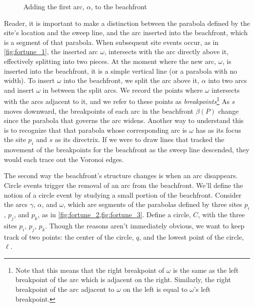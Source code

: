 \documentclass[12pt,twoside]{reedthesis}
\begin{document}

        \begin{figure}[!h]        
          \centering
          
          \caption{Adding the first arc, $\alpha$, to the beachfront}
          \label{fig:beachfront_se}
        \end{figure}

        Reader, it is important to make a distinction between the parabola defined by the site's location and the sweep line, and the arc inserted into the beachfront, which is a segment of that parabola. When subsequent site events occur, as in \cref{fig:fortune_1}, the inserted arc $\omega$, intersects with the arc directly above it, effectively splitting into two pieces. At the moment where the new arc, $\omega$, is inserted into the beachfront, it is a simple vertical line (or a parabola with no width). To insert $\omega$ into the beachfront, we split the arc above it, $\alpha$ into two arcs and insert $\omega$ in between the split arcs. We record the points where $\omega$ intersects with the arcs adjacent to it, and we refer to these points as \emph{breakpoints}\footnote{Note that this means that the right breakpoint of $\omega$ is the same as the left breakpoint of the arc which is adjacent on the right. Similarly, the right breakpoint of the arc adjacent to $\omega$ on the left is equal to $\omega$'s left breakpoint.} As $s$ moves downward, the breakpoints of each arc in the beachfront $\beta(P)$ change since the parabola that governs the arc widens. Another way to understand this is to recognize that that parabola whose corresponding arc is $\omega$ has as its focus the site $p_{i}$ and $s$ as its directrix. If we were to draw lines that tracked the movement of the breakpoints for the beachfront as the sweep line descended, they would each trace out the Voronoi edges. \par


        The second way the beachfront's structure changes is when an arc disappears. Circle events trigger the removal of an arc from the beachfront. We'll define the notion of a circle event by studying a small portion of the beachfront. Consider the arcs $\gamma$, $\alpha$, and $\omega$, which are segments of the parabolas defined by three sites $p_{i}$, $p_{j}$, and $p_{k}$, as in \cref{fig:fortune_2,fig:fortune_3}. Define a circle, $C$, with the three sites $p_{i}$, $p_{j}$, $p_{k}$. Though the reasons aren't immediately obvious, we want to keep track of two points: the center of the circle, $q$, and the lowest point of the circle, $\ell$.\par
\end{document}

